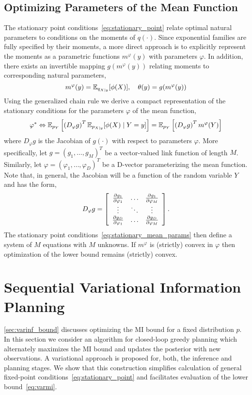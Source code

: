 \documentclass{article}
\begin{document}
\subsection{Optimizing Parameters of the Mean Function}\label{sec:mean_func}
The stationary point conditions~\eqref{eq:stationary_point} relate
optimal natural parameters to conditions on the moments of $q(\cdot)$.
Since exponential families are fully specified by their moments, a
more direct approach is to explicitly represent the moments as a
parametric functions $m^{\varphi}(y)$ with parameters $\varphi$.  In
addition, there exists an invertible mapping $g(m^\varphi(y))$
relating moments to corresponding natural parameters,
\begin{equation}
  m^{\varphi}(y) = \operatorname{\mathbb{E}}_{q_{X\mid y}}[ \phi(X) ], \quad \theta(y) = g(m^\varphi(y))
\end{equation}
Using the generalized chain rule we derive a compact representation of
the stationary conditions for the parameters $\varphi$ of the mean
function,
\begin{equation}\label{eq:stationary_mean_params}
  \varphi^{*} \Leftrightarrow \operatorname{\mathbb{E}}_{p_Y}\left[ \left( D_\varphi
    g \right)^T \operatorname{\mathbb{E}}_{p_{X\mid y}}[ \phi(X) \mid Y=y ] \right] =
  \operatorname{\mathbb{E}}_{p_Y}\left[ \left( D_\varphi
    g \right)^T m^{\varphi}(Y) \right]
\end{equation}
where $D_\varphi g$ is the Jacobian of $g(\cdot)$ with respect to
parameters $\varphi$.  More specifically, let $g = (g_1, \ldots,
g_M)^T$ be a vector-valued link function of length $M$.  Similarly,
let $\varphi = (\varphi_1, \ldots, \varphi_D)^T$ be a D-vector
parameterizing the mean function.  Note that, in
general, the Jacobian will be a function of the random variable $Y$
and has the form,
\begin{equation}
  D_\varphi g = \left[ \begin{array}{cccccccccccccccccccc} 
    \frac{\partial g_1}{\partial \varphi_1} & \ldots & \frac{\partial
      g_1}{\partial \varphi_M} \\
    \vdots & \ddots & \vdots \\
    \frac{\partial g_D}{\partial \varphi_1} & \ldots & \frac{\partial
      g_D}{\partial \varphi_M}
     \end{array} \right].
\end{equation}
The stationary point conditions~\eqref{eq:stationary_mean_params} then
define a system of $M$ equations with $M$ unknowns.  If $m^\varphi$ is
(strictly) convex in $\varphi$ then optimization of the lower bound
remains (strictly) convex.


\label{sec:sequential}
\section{Sequential Variational Information Planning}
\SEC\ref{sec:varinf_bound} discusses optimizing the MI bound for a
fixed distribution $p$. In this section we consider an algorithm for
closed-loop greedy planning which alternately maximizes the MI bound
and updates the posterior with new observations.  A variational
approach is proposed for, both, the inference and planning stages.  We
show that this construction simplifies calculation of general
fixed-point conditions~\eqref{eq:stationary_point} and facilitates evaluation of the
lower bound~\eqref{eq:varmi}.
\end{document}
